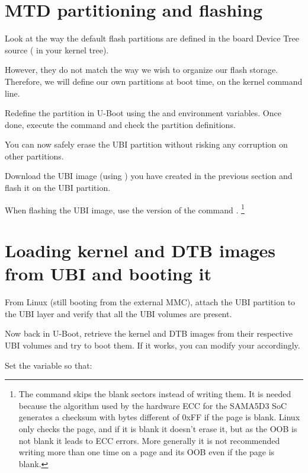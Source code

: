 %
%
%

\section{MTD partitioning and flashing}

Look at the way the default flash partitions are defined in the board
Device Tree source (
in your kernel tree).

However, they do not match the way we wish to organize our flash
storage. Therefore, we will define our own partitions at boot time,
on the kernel command line.

Redefine the partition in U-Boot using the  and
 environment variables.
Once done, execute the  command and check the partition
definitions.

You can now safely erase the UBI partition without risking any
corruption on other partitions.

Download the UBI image (using ) you have created in the
previous section and flash it on the UBI partition.

When flashing the UBI image, use the  version of the
command .
\footnote{The command  skips
  the blank sectors instead of writing them. It is needed because the
  algorithm used by the hardware ECC for the SAMA5D3 SoC generates a
  checksum with bytes different of 0xFF if the page is blank. Linux
  only checks the page, and if it is blank it doesn't erase it, but as
  the OOB is not blank it leads to ECC errors. More generally it is
  not recommended writing more than one time on a page and its OOB
  even if the page is blank.}

\section{Loading kernel and DTB images from UBI and booting it}

From Linux (still booting from the external MMC), attach the UBI
partition to the UBI layer and verify that all the UBI volumes are
present.

Now back in U-Boot, retrieve the kernel and DTB images from their
respective UBI volumes and try to boot them. If it works, you can
modify your  accordingly.

Set the  variable so that:


